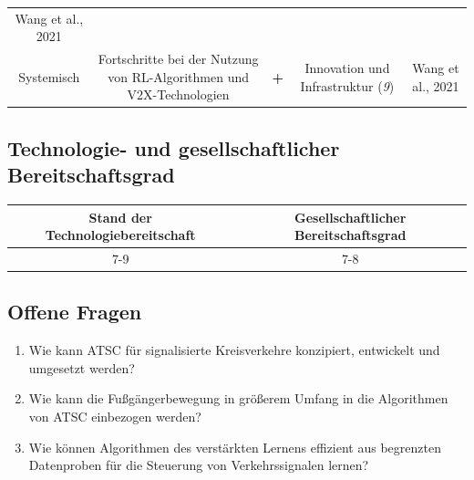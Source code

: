 \documentclass[
]{book}
\providecommand{\tightlist}{%
  \setlength{\itemsep}{0pt}\setlength{\parskip}{0pt}}
\begin{document}
\begin{longtable}[]{@{}ccccc@{}}
\begin{minipage}[t]{0.17\columnwidth}
Wang et al., 2021\strut
\end{minipage}\tabularnewline
\begin{minipage}[t]{0.17\columnwidth}\centering
Systemisch\strut
\end{minipage} & \begin{minipage}[t]{0.16\columnwidth}\centering
Fortschritte bei der Nutzung von RL-Algorithmen und V2X-Technologien\strut
\end{minipage} & \begin{minipage}[t]{0.17\columnwidth}\centering
\textbf{+}\strut
\end{minipage} & \begin{minipage}[t]{0.17\columnwidth}\centering
Innovation und Infrastruktur (\emph{9})\strut
\end{minipage} & \begin{minipage}[t]{0.17\columnwidth}\centering
Wang et al., 2021\strut
\end{minipage}\tabularnewline
\bottomrule
\end{longtable}

\hypertarget{technologie--und-gesellschaftlicher-bereitschaftsgrad-13}{%
\subsection*{Technologie- und gesellschaftlicher Bereitschaftsgrad}\label{technologie--und-gesellschaftlicher-bereitschaftsgrad-13}}

\begin{longtable}[]{@{}cc@{}}
\toprule
Stand der Technologiebereitschaft & Gesellschaftlicher Bereitschaftsgrad\tabularnewline
\midrule
\endhead
7-9 & 7-8\tabularnewline
\bottomrule
\end{longtable}

\hypertarget{offene-fragen-15}{%
\subsection*{Offene Fragen}\label{offene-fragen-15}}

\begin{enumerate}
\def\labelenumi{\arabic{enumi}.}
\tightlist
\item
  Wie kann ATSC für signalisierte Kreisverkehre konzipiert, entwickelt und umgesetzt werden?
\item
  Wie kann die Fußgängerbewegung in größerem Umfang in die Algorithmen von ATSC einbezogen werden?
\item
  Wie können Algorithmen des verstärkten Lernens effizient aus begrenzten Datenproben für die Steuerung von Verkehrssignalen lernen?
\end{enumerate}
\end{document}
